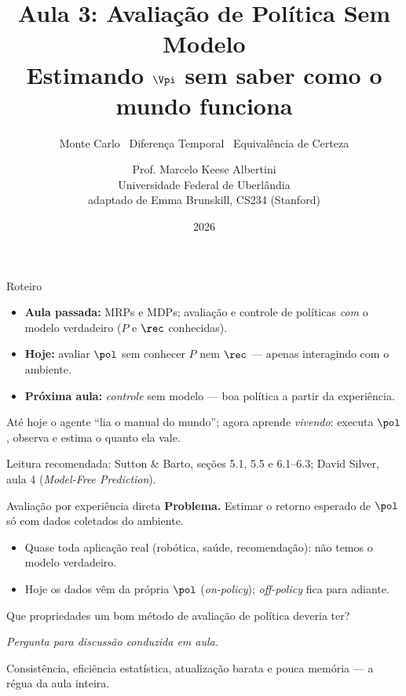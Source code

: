 \documentclass[aspectratio=169, 11pt]{beamer}
\title[Aula 3 — Avaliação sem modelo]{Aula 3: Avaliação de Política Sem Modelo\\
  Estimando $\Vpi$ sem saber como o mundo funciona}
\subtitle[Aprendizagem por Reforço]{Monte Carlo \textbullet\ Diferença Temporal \textbullet\ Equivalência de Certeza}
\author[Prof. Marcelo K. Albertini]{Prof. Marcelo Keese Albertini \\
  \footnotesize Universidade Federal de Uberlândia \\
  \footnotesize adaptado de Emma Brunskill, CS234 (Stanford)}
\institute{Aprendizagem por Reforço}
\date{2026}
\newcommand{\paradiscussao}{\vspace{-0.2em}
  {\footnotesize\color{rlCinza}\itshape Pergunta para discussão conduzida em aula.}}
\begin{document}
\begin{frame}\titlepage\end{frame}

\begin{frame}{Roteiro}
  \begin{itemize}
    \item \textbf{Aula passada:} MRPs e MDPs; avaliação e controle de
      políticas \emph{com} o modelo verdadeiro ($P$ e $\rec$ conhecidas).
    \item \textbf{Hoje:} avaliar $\pol$ \alert{sem} conhecer $P$ nem
      $\rec$ — apenas interagindo com o ambiente.
    \item \textbf{Próxima aula:} \emph{controle} sem modelo — boa política
      a partir da experiência.
  \end{itemize}

  \begin{ideiabox}
    Até hoje o agente ``lia o manual do mundo''; agora aprende
    \emph{vivendo}: executa $\pol$, observa e estima o quanto ela vale.
  \end{ideiabox}

  \medskip
  {\small\color{rlCinza} Leitura recomendada: Sutton \& Barto,
  seções 5.1, 5.5 e 6.1–6.3; David Silver, aula 4 (\emph{Model-Free Prediction}).}
\end{frame}

\begin{frame}{Avaliação por experiência direta}
  \textbf{Problema.} Estimar o retorno esperado de $\pol$ só com dados
  coletados do ambiente.
  \begin{itemize}\setlength{\itemsep}{0.2ex}
    \item Quase toda aplicação real (robótica, saúde, recomendação):
      \alert{não temos} o modelo verdadeiro.
    \item Hoje os dados vêm da própria $\pol$ (\emph{on-policy});
      \emph{off-policy} fica para adiante.
  \end{itemize}

  \begin{quizbox}{}
    Que propriedades um bom método de avaliação de política deveria ter?
  \end{quizbox}
  \paradiscussao

  \pause
  \begin{respbox}
    Consistência, eficiência estatística, atualização barata e pouca
    memória — a régua da aula inteira.
  \end{respbox}
\end{frame}
\end{document}
